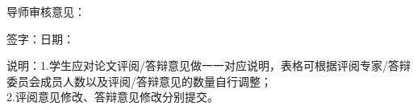 \documentclass[12pt,a4paper]{article}
\begin{document}
\vspace{20pt}

\noindent 导师审核意见：

\vspace{30pt}

\noindent 签字：\hspace{8cm}日期：

\vspace{10pt}

\noindent\small 说明：1.学生应对论文评阅/答辩意见做一一对应说明，表格可根据评阅专家/答辩委员会成员人数以及评阅/答辩意见的数量自行调整；\\
2.评阅意见修改、答辩意见修改分别提交。
\end{document}
